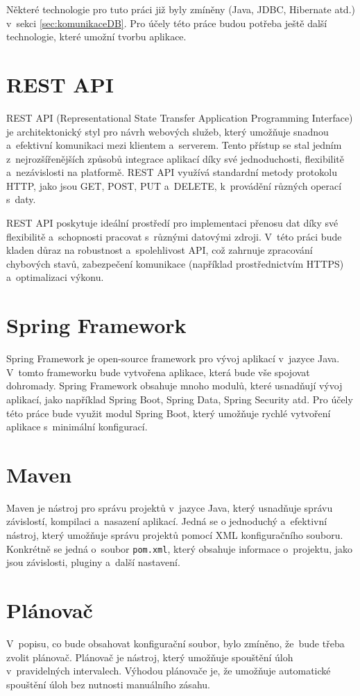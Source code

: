 Některé technologie pro tuto práci již byly zmíněny (Java, JDBC, Hibernate atd.) v~sekci \ref{sec:komunikaceDB}.
Pro účely této práce budou potřeba ještě další technologie, které umožní tvorbu aplikace.

\section{REST API}
REST API (Representational State Transfer Application Programming Interface) je architektonický
styl pro návrh webových služeb, který umožňuje snadnou a~efektivní komunikaci mezi klientem a~serverem.
Tento přístup se stal jedním z~nejrozšířenějších způsobů integrace aplikací díky své jednoduchosti,
flexibilitě a~nezávislosti na platformě. REST API využívá standardní metody protokolu HTTP, jako jsou
GET, POST, PUT a~DELETE, k~provádění různých operací s~daty.

REST API poskytuje ideální prostředí pro implementaci přenosu dat díky své flexibilitě a~schopnosti
pracovat s~různými datovými zdroji. V~této práci bude kladen důraz na robustnost a~spolehlivost API,
což zahrnuje zpracování chybových stavů, zabezpečení komunikace (například prostřednictvím HTTPS)
a~optimalizaci výkonu.
\cite{rest_api}

\section{Spring Framework}
Spring Framework je open-source framework pro vývoj aplikací v~jazyce Java.
V~tomto frameworku bude vytvořena aplikace, která bude vše spojovat dohromady.
Spring Framework obsahuje mnoho modulů, které usnadňují vývoj aplikací,
jako například Spring Boot, Spring Data, Spring Security atd.
Pro účely této práce bude využit modul Spring Boot, který umožňuje rychlé
vytvoření aplikace s~minimální konfigurací.  
\cite{spring_framework}

\section{Maven}
Maven je nástroj pro správu projektů v~jazyce Java, který usnadňuje správu závislostí,
kompilaci a~nasazení aplikací. Jedná se o jednoduchý a~efektivní nástroj, který umožňuje
správu projektů pomocí XML konfiguračního souboru.
Konkrétně se jedná o~soubor \texttt{pom.xml}, který obsahuje informace o~projektu,
jako jsou závislosti, pluginy a~další nastavení.
\cite{maven}

\section{Plánovač}
V~popisu, co bude obsahovat konfigurační soubor, bylo zmíněno, že~bude třeba zvolit plánovač.
Plánovač je nástroj, který umožňuje spouštění úloh v~pravidelných intervalech.
Výhodou plánovače je, že umožňuje automatické spouštění úloh bez nutnosti manuálního zásahu.

